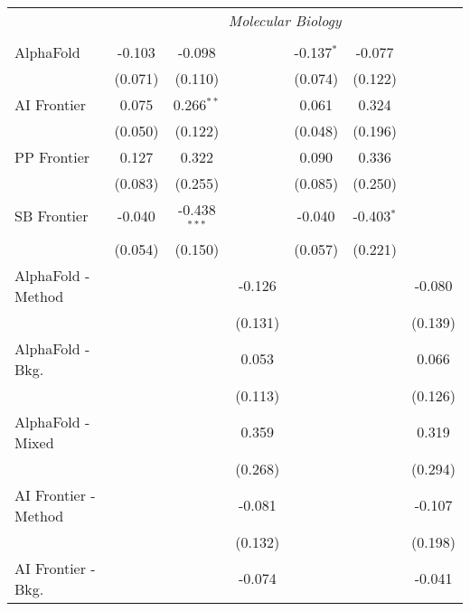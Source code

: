\begin{tabular}{lcccccc}
 & \multicolumn{6}{c}{\textit{Molecular Biology}} \\ \\
   AlphaFold            & -0.103  & -0.098         &               & -0.137$^{*}$ & -0.077       &   \\   
                        & (0.071) & (0.110)        &               & (0.074)      & (0.122)      &   \\   
   AI Frontier          & 0.075   & 0.266$^{**}$   &               & 0.061        & 0.324        &   \\   
                        & (0.050) & (0.122)        &               & (0.048)      & (0.196)      &   \\   
   PP Frontier          & 0.127   & 0.322          &               & 0.090        & 0.336        &   \\   
                        & (0.083) & (0.255)        &               & (0.085)      & (0.250)      &   \\   
   SB Frontier          & -0.040  & -0.438$^{***}$ &               & -0.040       & -0.403$^{*}$ &   \\   
                        & (0.054) & (0.150)        &               & (0.057)      & (0.221)      &   \\   
   AlphaFold - Method   &         &                & -0.126        &              &              & -0.080\\   
                        &         &                & (0.131)       &              &              & (0.139)\\   
   AlphaFold - Bkg.     &         &                & 0.053         &              &              & 0.066\\   
                        &         &                & (0.113)       &              &              & (0.126)\\   
   AlphaFold - Mixed    &         &                & 0.359         &              &              & 0.319\\   
                        &         &                & (0.268)       &              &              & (0.294)\\   
   AI Frontier - Method &         &                & -0.081        &              &              & -0.107\\   
                        &         &                & (0.132)       &              &              & (0.198)\\   
   AI Frontier - Bkg.   &         &                & -0.074        &              &              & -0.041\\   

\end{tabular}
